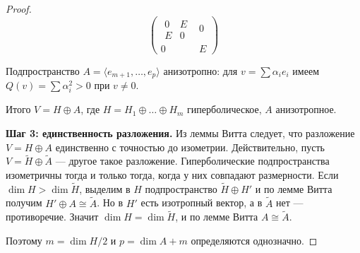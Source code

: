 \begin{theorem}
\begin{proof}
        \[
            \left(
            \begin{array}{c|c}
            \begin{array}{c|c}
            0 & E \\ \hline
            E & 0
            \end{array} & 0 \\ \hline
            \text{0} & E
            \end{array}
            \right)
        \]


        Подпространство $A = \langle e_{m+1}, \dots, e_p \rangle$ анизотропно:
        для $v = \sum \alpha_i e_i$ имеем $Q(v) = \sum \alpha_i^2 > 0$ при $v \neq 0$.

        Итого $V = H \oplus A$, где $H = H_1 \oplus \dots \oplus H_m$ гиперболическое, $A$ анизотропное.

        \textbf{Шаг 3: единственность разложения.} Из леммы Витта следует,
        что разложение $V = H \oplus A$ единственно с точностью до изометрии.
        Действительно, пусть $V = \tilde{H} \oplus \tilde{A}$ --- другое такое разложение.
        Гиперболические подпространства изометричны тогда и только тогда, когда у них совпадают размерности.
        Если $\dim H > \dim \tilde{H}$, выделим в $H$ подпространство $\tilde{H} \oplus H'$ и по лемме Витта получим
        $H' \oplus A \cong \tilde{A}$. Но в $H'$ есть изотропный вектор, а в $\tilde{A}$ нет --- противоречие.
        Значит $\dim H = \dim \tilde{H}$, и по лемме Витта $A \cong \tilde{A}$.

        Поэтому $m = \dim H / 2$ и $p = \dim A + m$ определяются однозначно.
    \end{proof}
\end{theorem}
